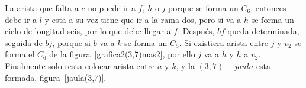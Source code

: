 \documentclass[12pt]{book}
\theoremstyle{definition}
\begin{document}
\begin{figure}
  \centering
  \caption{} \label{grafica1(3,7)mas2}
\end{figure}


La arista que falta a $c$ no puede ir a $f$, $h$ o $j$ porque se forma
un $C_6$, entonces debe ir a $l$ y esta a su vez tiene que ir a la
rama dos, pero si va a $h$ se forma un ciclo de longitud seis, por lo
que debe llegar a $f$. Después, $bf$ queda determinada, seguida de
$bj$, porque si $b$ va a $k$ se forma un $C_5$. Si existiera arista
entre $j$ y $v_2$ se forma el $C_6$ de la
figura~\ref{grafica2(3,7)mas2}, por ello $j$ va a $h$ y $h$ a $v_2$.
Finalmente solo resta colocar arista entre $a$ y $k$, y la
$(3,7)-jaula$ esta formada, figura~\ref{jaula(3,7)}.
\end{document}
